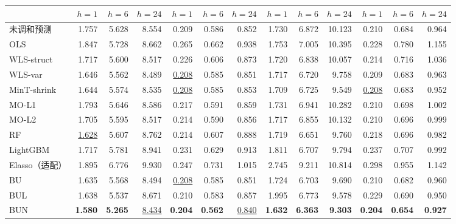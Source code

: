 \begin{table}[!htbp]
\begin{tabular*}{\textwidth}{@{\extracolsep{\fill}}l*{12}{r}@{}}
\cmidrule(lr){2-4}\cmidrule(lr){5-7}\cmidrule(lr){8-10}\cmidrule(l){11-13}
 & $h=1$ & $h=6$ & $h=24$ & $h=1$ & $h=6$ & $h=24$ & $h=1$ & $h=6$ & $h=24$ & $h=1$ & $h=6$ & $h=24$ \\
\midrule
未调和预测 & 1.757 & 5.628 & 8.554 & 0.209 & 0.586 & 0.852 & 1.730 & 6.872 & 10.123 & 0.210 & 0.684 & 0.964 \\
OLS & 1.847 & 5.728 & 8.662 & 0.265 & 0.662 & 0.938 & 1.753 & 7.005 & 10.395 & 0.228 & 0.780 & 1.155 \\
WLS-struct & 1.717 & 5.600 & 8.517 & 0.226 & 0.606 & 0.873 & 1.720 & 6.838 & 10.057 & 0.214 & 0.716 & 1.036 \\
WLS-var & 1.646 & 5.562 & 8.489 & \cellcolor{accuracysecond}\underline{0.208} & 0.585 & 0.851 & 1.717 & 6.720 & 9.758 & 0.209 & 0.683 & 0.963 \\
MinT-shrink & 1.644 & 5.574 & 8.535 & \cellcolor{accuracysecond}\underline{0.208} & 0.585 & 0.853 & 1.709 & 6.725 & 9.549 & \cellcolor{accuracysecond}\underline{0.208} & 0.683 & 0.952 \\
MO-L1 & 1.793 & 5.646 & 8.586 & 0.217 & 0.591 & 0.859 & 1.731 & 6.941 & 10.282 & 0.210 & 0.698 & 1.002 \\
MO-L2 & 1.705 & 5.595 & 8.517 & 0.214 & 0.590 & 0.856 & 1.717 & 6.855 & 10.132 & 0.210 & 0.696 & 0.999 \\
RF & \cellcolor{accuracysecond}\underline{1.628} & 5.607 & 8.762 & 0.214 & 0.607 & 0.888 & 1.719 & 6.651 & 9.760 & 0.218 & 0.696 & 0.982 \\
LightGBM & 1.717 & 5.781 & 8.941 & 0.231 & 0.629 & 0.913 & 1.811 & 6.707 & 9.794 & 0.237 & 0.707 & 0.992 \\
Elasso（适配） & 1.895 & 6.776 & 9.930 & 0.247 & 0.731 & 1.015 & 2.745 & 9.211 & 10.814 & 0.298 & 0.955 & 1.142 \\
\midrule
BU & 1.635 & 5.568 & 8.494 & \cellcolor{accuracysecond}\underline{0.208} & 0.585 & 0.851 & 1.724 & 6.703 & 9.690 & 0.210 & 0.682 & 0.960 \\
BUL & 1.638 & 5.537 & 8.671 & 0.210 & 0.583 & 0.857 & 1.995 & 6.773 & 9.578 & 0.229 & 0.690 & 0.950 \\
BUN & \cellcolor{accuracybest}\textbf{1.580} & \cellcolor{accuracybest}\textbf{5.265} & \cellcolor{accuracysecond}\underline{8.434} & \cellcolor{accuracybest}\textbf{0.204} & \cellcolor{accuracybest}\textbf{0.562} & \cellcolor{accuracysecond}\underline{0.840} & \cellcolor{accuracybest}\textbf{1.632} & \cellcolor{accuracybest}\textbf{6.363} & \cellcolor{accuracybest}\textbf{9.303} & \cellcolor{accuracybest}\textbf{0.204} & \cellcolor{accuracybest}\textbf{0.654} & \cellcolor{accuracybest}\textbf{0.927} \\

\end{tabular*}
\end{table}
